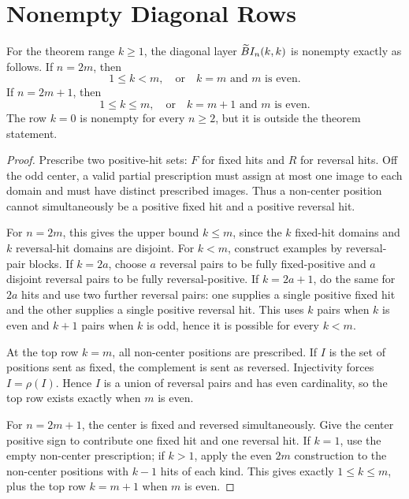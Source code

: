 \section{Nonempty Diagonal Rows}\label{sec:nonempty}

\begin{lemma}\label{lem:nonempty}
For the theorem range $k\ge1$, the diagonal layer $\widetilde{B}I_n(k,k)$ is nonempty exactly as follows.
If $n=2m$, then
\[
  1\le k<m, \quad\text{or}\quad k=m \text{ and } m \text{ is even}.
\]
If $n=2m+1$, then
\[
  1\le k\le m, \quad\text{or}\quad k=m+1 \text{ and } m \text{ is even}.
\]
The row $k=0$ is nonempty for every $n\ge2$, but it is outside the theorem statement.
\end{lemma}

\begin{proof}
Prescribe two positive-hit sets: $F$ for fixed hits and $R$ for reversal hits.  Off the odd center, a valid partial
prescription must assign at most one image to each domain and must have distinct prescribed images.  Thus a non-center
position cannot simultaneously be a positive fixed hit and a positive reversal hit.

For $n=2m$, this gives the upper bound $k\le m$, since the $k$ fixed-hit domains and $k$ reversal-hit domains are
disjoint.  For $k<m$, construct examples by reversal-pair blocks.  If $k=2a$, choose $a$ reversal pairs to be fully
fixed-positive and $a$ disjoint reversal pairs to be fully reversal-positive.  If $k=2a+1$, do the same for $2a$ hits
and use two further reversal pairs: one supplies a single positive fixed hit and the other supplies a single positive
reversal hit.  This uses $k$ pairs when $k$ is even and $k+1$ pairs when $k$ is odd, hence it is possible for every
$k<m$.

At the top row $k=m$, all non-center positions are prescribed.  If $I$ is the set of positions sent as fixed, the
complement is sent as reversed.  Injectivity forces $I=\rho(I)$.  Hence $I$ is a union of reversal pairs and has even
cardinality, so the top row exists exactly when $m$ is even.

For $n=2m+1$, the center is fixed and reversed simultaneously.  Give the center positive sign to contribute one fixed
hit and one reversal hit.  If $k=1$, use the empty non-center prescription; if $k>1$, apply the even
$2m$ construction to the non-center positions with $k-1$ hits of each kind.  This gives exactly
$1\le k\le m$, plus the top row $k=m+1$ when $m$ is even.
\end{proof}
